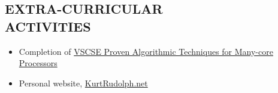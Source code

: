 \documentclass[margin]{res}
\begin{document}
\begin{resume}
\section{EXTRA-CURRICULAR \\ ACTIVITIES}             
  \begin{itemize}
    \itemsep -2pt %
    \item Completion of \href{http://www.vscse.org/summerschool/2012/manycore.html}
          {VSCSE Proven Algorithmic Techniques for Many-core Processors}
    \item Personal website, \href{http://kurtrudolph.net/about.html}{KurtRudolph.net}
  \end{itemize}
  
 

\end{resume}
\end{document}

